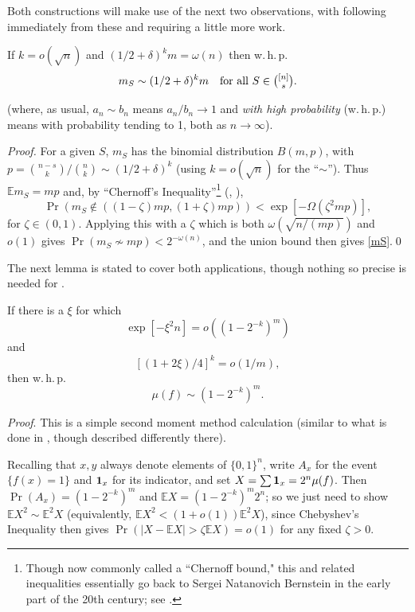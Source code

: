 \documentclass{toc}
\newcommand{\one}[0]{{\bf 1}}
\newcommand{\beq}[1]{\begin{equation}\label{#1}}
\newcommand{\enq}[0]{\end{equation}}
\newcommand{\mn}[0]{\medskip\noindent}
\newcommand{\nin}[0]{\noindent}
\newcommand{\ra}[0]{\rightarrow}
\newcommand{\0}[0]{\emptyset}
\newcommand{\Cc}[0]{\tbinom}
\newcommand{\gd}[0]{\delta }
\newcommand{\go}[0]{\omega}
\newcommand{\gO}[0]{\Omega}
\newcommand{\gz}[0]{\zeta}
\begin{document}
Both constructions will make use of the next two
observations, with 
following immediately from these and
 requiring a little more work.
\begin{lemma}\label{mSlemma}
If $k=o(\sqrt{n})$ and $(1/2+\gd)^km=\go(n)$ then
w.\,h.\,p.
\beq{mS}
%
%
%
%
%
%
%
m_S \sim (1/2+\gd)^km ~~ \text{ for all } S\in \Cc{[n]}{s}. %
%
\enq
\end{lemma}
\nin
(where, as usual, $a_n\sim b_n$ means $a_n/b_n\ra 1 $
and
\emph{with high probability} (w.\,h.\,p.) means
with probability tending to 1, both as $n\ra\infty$).


\mn
\emph{Proof.}
For a given $S$, $m_S$ has the binomial distribution
$B(m,p)$, with $p = \binom{n-s}{k}/\binom{n}{k}\sim(1/2+\gd)^k$
(using $k=o(\sqrt{n})$ for the ``$\sim $'').
Thus
$\mathbb E  m_S=mp$ and,
by ``Chernoff's Inequality''\footnote{Though now commonly called a ``Chernoff bound," this and related inequalities essentially go back to
 Sergei Natanovich  %
Bernstein in the early
part of the 20th century; see \cite{Wiki}.}
%
%
%
%
%
%
(\eg, \cite[Theorem 2.1]{JLR}),
\begin{equation}   \label{eq:chernoff}
\Pr(m_S\not\in ((1-\gz)mp,(1+\gz)mp)) < \exp [-\gO(\gz^2mp)],
\end{equation}
for $\gz\in (0,1)$.
Applying this with a $\gz$ which is both
$\go(\sqrt{n/(mp)})$ and $o(1)$ gives
$\Pr(m_S\not\sim mp )< 2^{-\go(n)}$,
and the union bound then gives \eqref{mS}.\qed


\medskip
The next lemma is stated to cover
both applications, though nothing so precise
is needed for .

\begin{lemma}\label{muflemma}
If there is a $\xi$ for which
\beq{xi1}
\exp[-\xi^2n] = o((1-2^{-k})^m)
\enq
and
\beq{xi2}
[(1+2\xi)/4]^k=o(1/m),
\enq
then
w.\,h.\,p.
\beq{muf}
\mu(f) \sim (1-2^{-k})^m.
\enq
\end{lemma}


\mn
\emph{Proof}.
This is a simple second moment method calculation
(similar to %
what is %
done in \cite{AL}, though described
differently there).


Recalling that $x,y$ always denote elements of $\{0,1\}^n$,
write $A_x$ for the event $\{f(x)=1\}$ and $\one_x$
for its indicator,
and set $X=\sum \one_x=2^n\mu(f) $.
Then
$\Pr(A_x)= (1-2^{-k})^m$ and
$\mathbb E  X = (1-2^{-k})^m2^n$; so we just need to show
$
\mathbb E  X^2\sim \mathbb E ^2 X
$ 
(equivalently, $\mathbb E  X^2<(1+o(1))\mathbb E ^2 X$),
since Chebyshev's Inequality then gives
$\Pr(|X-\mathbb E  X|> \gz\mathbb E  X) =o(1)$
for any fixed $\gz>0$.
\end{document}
